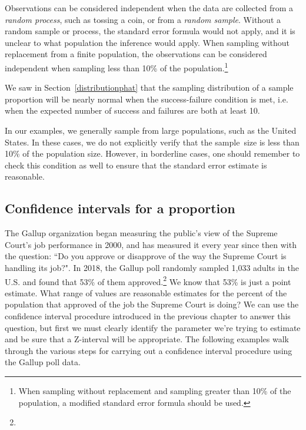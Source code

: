 \begin{description}
\setlength{\itemsep}{0mm}
\item[Independent.] Observations can be considered independent when the data are collected from a \emph{random process}, such as tossing a coin, or from a \emph{random sample}.  Without a random sample or process, the standard error formula would not apply, and it is unclear to what population the inference would apply.  When sampling without replacement from a finite population, the observations can be considered independent when sampling less than 10\% of the population.\footnote{When sampling without replacement and sampling greater than 10\% of the population, a modified standard error formula should be used.}
\item[Nearly normal sampling distribution.] We saw in Section~\ref{distributionphat} that the sampling distribution of a sample proportion will be nearly normal when the success-failure condition is met, i.e. when the expected number of success and failures are both at least 10.  
\end{description}
In our examples, we generally sample from large populations, such as the United States.  In these cases, we do not explicitly verify that the sample~size is less than 10\% of the population size.  However, in borderline cases, one should remember to check this condition as well to ensure that the standard error estimate is reasonable.


\D{\newpage}

\subsection{Confidence intervals for a proportion}
\label{confIntForPropSection}


The Gallup organization began measuring the public's view of the Supreme Court's job performance in 2000, and has measured it every year since then with the question: ``Do you approve or disapprove of the way the Supreme Court is handling its job?".  In 2018, the Gallup poll randomly sampled 1,033 adults in the U.S. and found that 53\% of them approved.\footnote{}  We know that 53\% is just a point estimate.  What range of values are reasonable estimates for the percent of the population that approved of the job the Supreme Court is doing?  We can use the confidence interval procedure introduced in the previous chapter to answer this question, but first we must clearly identify the parameter we're trying to estimate and be sure that a Z-interval will be appropriate.  The following examples walk through the various steps for carrying out a confidence interval procedure using the Gallup poll data.

